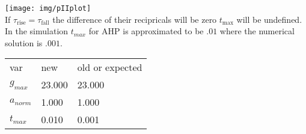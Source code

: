 \texttt{[image: img/pIIplot]} \\
If $\tau_\text{rise} = \tau_\text{fall}$ the difference of their recipricals will be zero $t_\text{max}$ will be undefined.\\
In the simulation $t_{max}$ for AHP is approximated to be $.01$ where the numerical solution is $.001$. \\

\begin{centering}
\begin{tabular}{lll}
var&	new&	old or expected\\
$g_{max}$&	23.000&	23.000\\
$a_{norm}$&	1.000&	1.000\\
$t_{max}$&	0.010&	0.001\\
\end{tabular}
\end{centering}
%
%

